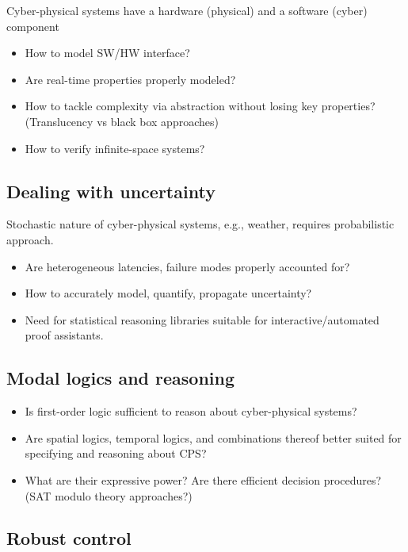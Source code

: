 \documentclass[
graybox,
envcountchap
]{svmult}
\begin{document}
\begin{bibunit}
    Cyber-physical systems have a hardware (physical) and a software (cyber) component
    
    \begin{itemize}
    \item How to model SW/HW interface?
    \item Are real-time properties properly modeled?
    \item  How to tackle complexity via abstraction without losing key properties?  (Translucency vs black box approaches)
    \item How to verify infinite-space systems?
    \end{itemize}

    \subsection{Dealing with uncertainty}

    Stochastic nature of cyber-physical systems, e.g., weather, requires probabilistic approach.
    
    \begin{itemize}
    \item Are heterogeneous latencies, failure modes properly accounted for?
    \item How to accurately model, quantify, propagate uncertainty?
    \item Need for statistical reasoning libraries suitable for interactive/automated proof assistants.
    \end{itemize}

    \subsection{Modal logics and reasoning}
    
    \begin{itemize}
    \item  Is first-order logic sufficient to reason about cyber-physical systems?
    \item Are spatial logics, temporal logics, and combinations thereof better suited for specifying and reasoning about CPS?
    \item What are their expressive power?   Are there efficient decision procedures?  (SAT modulo theory approaches?)
    \end{itemize}

    \subsection{Robust control}


\end{bibunit}
\end{document}
